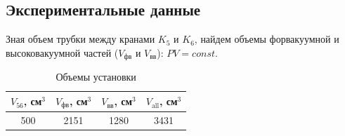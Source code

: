 \newpage

\subsection*{Экспериментальные данные}

Зная объем трубки между кранами $K_5$ и $K_6$, найдем объемы форвакуумной 
и высоковакуумной частей ($V_{\text{фв}}$ и $V_{\text{вв}}$): $PV = const$.
\begin{table}[h!]
    \centering
    \begin{tabular}{|c|c|c|c|}
        \hline
        $V_{56}$, см$^3$ & $V_{\text{фв}}$, см$^3$ & $V_{\text{вв}}$, см$^3$ & $V_{\text{all}}$, см$^3$\\\hline
        500 & 2151 & 1280 & 3431\\\hline
    \end{tabular}
    \caption{Объемы установки}
\end{table}

